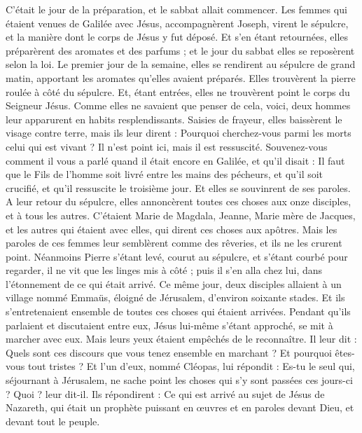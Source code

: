 \begin{multicols}{2}
C’était le jour de la préparation, et le sabbat allait commencer.
Les femmes qui étaient venues de Galilée avec Jésus, accompagnèrent Joseph, virent le sépulcre, et la manière dont le corps de Jésus y fut déposé.
Et s'en étant retournées, elles préparèrent des aromates et des parfums ; et le jour du sabbat elles se reposèrent selon la loi.
\VerseOne{}Le premier jour de la semaine, elles se rendirent au sépulcre de grand matin, apportant les aromates qu'elles avaient préparés.
Elles trouvèrent la pierre roulée à côté du sépulcre.
Et, étant entrées, elles ne trouvèrent point le corps du Seigneur Jésus.
Comme elles ne savaient que penser de cela, voici, deux hommes leur apparurent en habits resplendissants.
Saisies de frayeur, elles baissèrent le visage contre terre, mais ils leur dirent : Pourquoi cherchez-vous parmi les morts celui qui est vivant ?
Il n'est point ici, mais il est ressuscité. Souvenez-vous comment il vous a parlé quand il était encore en Galilée,
et qu’il disait : Il faut que le Fils de l'homme soit livré entre les mains des pécheurs, et qu'il soit crucifié, et qu'il ressuscite le troisième jour.
Et elles se souvinrent de ses paroles.
A leur retour du sépulcre, elles annoncèrent toutes ces choses aux onze disciples, et à tous les autres.
C’étaient Marie de Magdala, Jeanne, Marie mère de Jacques, et les autres qui étaient avec elles, qui dirent ces choses aux apôtres.
Mais les paroles de ces femmes leur semblèrent comme des rêveries, et ils ne les crurent point.
Néanmoins Pierre s'étant levé, courut au sépulcre, et s'étant courbé pour regarder, il ne vit que les linges mis à côté ; puis il s’en alla chez lui, dans l’étonnement de ce qui était arrivé.
Ce même jour, deux disciples allaient à un village nommé Emmaüs, éloigné de Jérusalem, d’environ soixante stades.
Et ils s'entretenaient ensemble de toutes ces choses qui étaient arrivées.
Pendant qu’ils parlaient et discutaient entre eux, Jésus lui-même s'étant approché, se mit à marcher avec eux.
Mais leurs yeux étaient empêchés de le reconnaître.
Il leur dit : Quels sont ces discours que vous tenez ensemble en marchant ? Et pourquoi êtes-vous tout tristes ?
Et l'un d'eux, nommé Cléopas, lui répondit : Es-tu le seul qui, séjournant à Jérusalem, ne sache point les choses qui s’y sont passées ces jours-ci ?
Quoi ? leur dit-il. Ils répondirent : Ce qui est arrivé au sujet de Jésus de Nazareth, qui était un prophète puissant en œuvres et en paroles devant Dieu, et devant tout le peuple.

\end{multicols}
